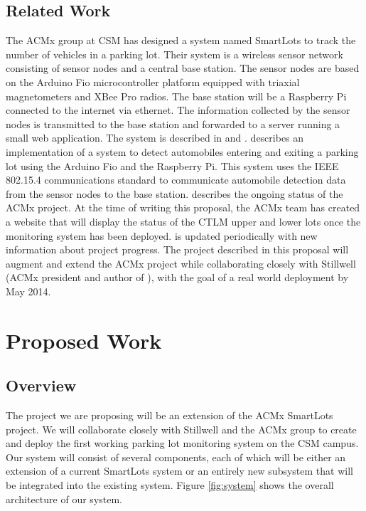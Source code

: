 \documentclass[11pt, oneside, fullpage, doublespace]{article}
\begin{document}
\subsection{Related Work}
The ACMx group at CSM has designed a system named SmartLots to track the number of vehicles in a parking lot. Their system is a wireless sensor network consisting of sensor nodes and a central base station. The sensor nodes are based on the Arduino Fio microcontroller platform equipped with triaxial magnetometers and XBee Pro radios. The base station will be a Raspberry Pi connected to the internet via ethernet. The information collected by the sensor nodes is transmitted to the base station and forwarded to a server running a small web application. The system is described in \cite{stillwell2013} and \cite{parkingWiki}. \cite{stillwell2013} describes an implementation of a system to detect automobiles entering and exiting a parking lot using the Arduino Fio and the Raspberry Pi. This system uses the IEEE 802.15.4 communications standard to communicate automobile detection data from the sensor nodes to the base station. \cite{parkingWiki} describes the ongoing status of the ACMx project. At the time of writing this proposal, the ACMx team has created a website that will display the status of the CTLM upper and lower lots once the monitoring system has been deployed. \cite{parkingWiki} is updated periodically with new information about project progress. The project described in this proposal will augment and extend the ACMx project while collaborating closely with Stillwell (ACMx president and author of \cite{stillwell2013}), with the goal of a real world deployment by May 2014.

\section{Proposed Work}
\subsection{Overview}
The project we are proposing will be an extension of the ACMx SmartLots project. We will collaborate closely with Stillwell and the ACMx group to create and deploy the first working parking lot monitoring system on the CSM campus. Our system will consist of several components, each of which will be either an extension of a current SmartLots system or an entirely new subsystem that will be integrated into the existing system. Figure \ref{fig:system} shows the overall architecture of our system.
\end{document}
